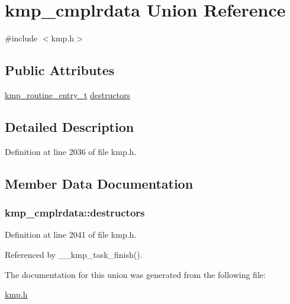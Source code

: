 \hypertarget{unionkmp__cmplrdata}{\section{kmp\-\_\-cmplrdata Union Reference}
\label{unionkmp__cmplrdata}
}


{\ttfamily \#include $<$kmp.\-h$>$}

\subsection*{Public Attributes}
\begin{DoxyCompactItemize}
\item 
\hyperlink{group__BASIC__TYPES_ga76e21422ff9984d9bafd0b36277ae115}{kmp\-\_\-routine\-\_\-entry\-\_\-t} \hyperlink{unionkmp__cmplrdata_a55f86681cc0ecc440233e7a93f89b402}{destructors}
\end{DoxyCompactItemize}


\subsection{Detailed Description}


Definition at line 2036 of file kmp.\-h.



\subsection{Member Data Documentation}
\hypertarget{unionkmp__cmplrdata_a55f86681cc0ecc440233e7a93f89b402}{
\subsubsection[{destructors}]{ kmp\-\_\-cmplrdata\-::destructors}}\label{unionkmp__cmplrdata_a55f86681cc0ecc440233e7a93f89b402}


Definition at line 2041 of file kmp.\-h.



Referenced by \-\_\-\-\_\-kmp\-\_\-task\-\_\-finish().



The documentation for this union was generated from the following file\-:\begin{DoxyCompactItemize}
\item 
\hyperlink{kmp_8h}{kmp.\-h}\end{DoxyCompactItemize}
